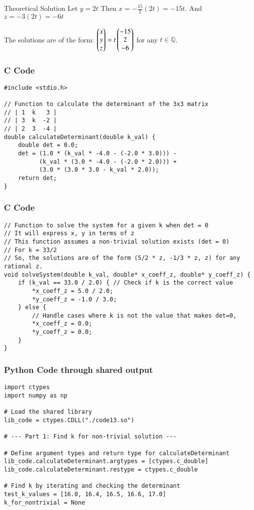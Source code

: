 \documentclass{beamer}
\begin{document}
\begin{frame}{Theoretical Solution}
Let $y = 2t$ 
Then $x = -\frac{15}{2}(2t) = -15t$.
And $z = -3(2t) = -6t$



The solutions are of the form:
$\begin{pmatrix}x \\ y \\ z\end{pmatrix} = t \begin{pmatrix}-15 \\ 2 \\ -6\end{pmatrix}$ for any $t \in \mathbb{Q}$.
\end{frame}

\begin{frame}[fragile]
\frametitle{C Code}
\begin{lstlisting}
#include <stdio.h>

// Function to calculate the determinant of the 3x3 matrix
// | 1  k   3 |
// | 3  k  -2 |
// | 2  3  -4 |
double calculateDeterminant(double k_val) {
    double det = 0.0;
    det = (1.0 * (k_val * -4.0 - (-2.0 * 3.0))) -
          (k_val * (3.0 * -4.0 - (-2.0 * 2.0))) +
          (3.0 * (3.0 * 3.0 - k_val * 2.0));
    return det;
}
\end{lstlisting}
\end{frame}

\begin{frame}[fragile]
\frametitle{C Code}
\begin{lstlisting}
// Function to solve the system for a given k when det = 0
// It will express x, y in terms of z
// This function assumes a non-trivial solution exists (det = 0)
// For k = 33/2
// So, the solutions are of the form (5/2 * z, -1/3 * z, z) for any rational z.
void solveSystem(double k_val, double* x_coeff_z, double* y_coeff_z) {
    if (k_val == 33.0 / 2.0) { // Check if k is the correct value
        *x_coeff_z = 5.0 / 2.0;
        *y_coeff_z = -1.0 / 3.0;
    } else {
        // Handle cases where k is not the value that makes det=0,
        *x_coeff_z = 0.0;
        *y_coeff_z = 0.0;
    }
}
\end{lstlisting}
 \end{frame}

\begin{frame}[fragile]
\frametitle{Python Code through shared output}
\begin{lstlisting}
import ctypes
import numpy as np

# Load the shared library
lib_code = ctypes.CDLL("./code13.so")

# --- Part 1: Find k for non-trivial solution ---

# Define argument types and return type for calculateDeterminant
lib_code.calculateDeterminant.argtypes = [ctypes.c_double]
lib_code.calculateDeterminant.restype = ctypes.c_double

# Find k by iterating and checking the determinant
test_k_values = [16.0, 16.4, 16.5, 16.6, 17.0]
k_for_nontrivial = None
\end{lstlisting}
 \end{frame}
\end{document}
